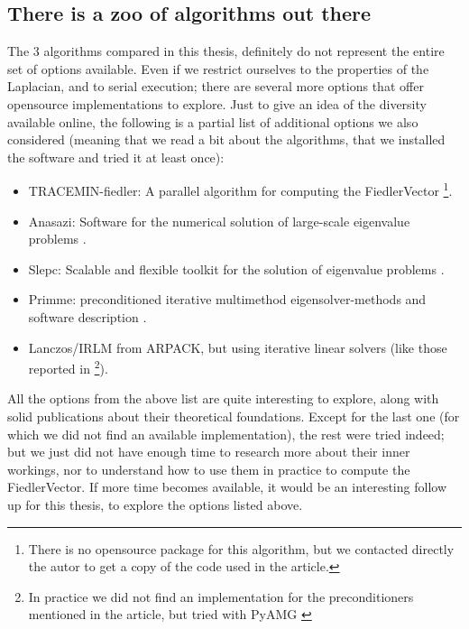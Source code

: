 \subsection{There is a zoo of algorithms out there}

The 3 algorithms compared in this thesis, definitely do not represent
the entire set of options available. Even if we restrict ourselves to
the properties of the \gls{Laplacian}, and to serial execution; there are
several more options that offer opensource implementations to
explore. Just to give an idea of the diversity available online, the
following is a partial list of additional options we also considered
(meaning that we read a bit about the algorithms, that we installed
the software and tried it at least once):

\begin{itemize}
  \item TRACEMIN-fiedler: A parallel algorithm for computing the
    \gls{FiedlerVector} \cite{trminfiedler} \footnote{There is no
      opensource package for this algorithm, but we contacted directly
    the autor to get a copy of the code used in the article.}.
  \item Anasazi: Software for the numerical solution of large-scale
    eigenvalue problems \cite{anasazi}.
  \item Slepc: Scalable and flexible toolkit for the solution of
    eigenvalue problems \cite{slepc}.
  \item Primme: preconditioned iterative multimethod
    eigensolver-methods and software description \cite{primme}.
  \item Lanczos/\gls{IRLM} from ARPACK, but using iterative linear solvers
    (like those reported in \cite{martinez16} \footnote{In practice we
  did not find an implementation for the preconditioners mentioned in
  the article, but tried with PyAMG \cite{pyamg}}). 
\end{itemize}

All the options from the above list are quite interesting to explore, 
along with solid publications about their theoretical
foundations. Except for the last one (for which we did not find an
available implementation), the rest were tried indeed; but we just did
not have enough time to research more about their inner workings, nor
to understand how to use them in practice to compute the
\gls{FiedlerVector}. If more time becomes available, it would be an interesting
follow up for this thesis, to explore the options listed above.

